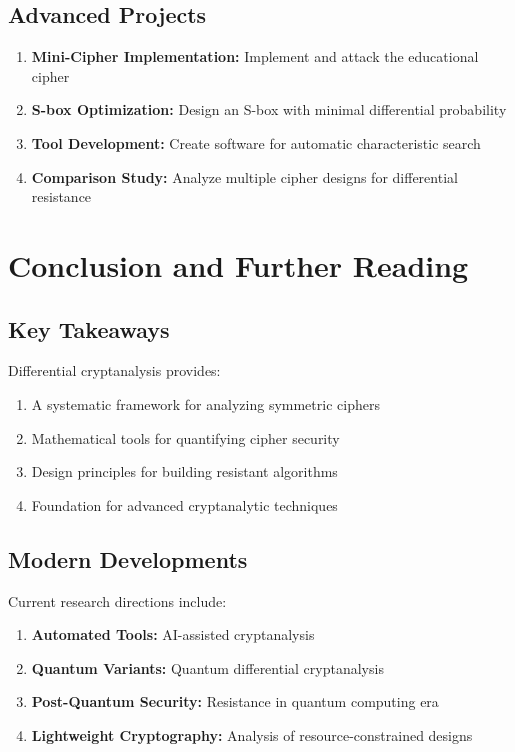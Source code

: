 \documentclass[12pt,a4paper]{article}
\theoremstyle{definition}
\begin{document}
\subsection{Advanced Projects}

\begin{enumerate}
    \item \textbf{Mini-Cipher Implementation:} Implement and attack the educational cipher
    \item \textbf{S-box Optimization:} Design an S-box with minimal differential probability
    \item \textbf{Tool Development:} Create software for automatic characteristic search
    \item \textbf{Comparison Study:} Analyze multiple cipher designs for differential resistance
\end{enumerate}

\section{Conclusion and Further Reading}

\subsection{Key Takeaways}

Differential cryptanalysis provides:

\begin{enumerate}
    \item A systematic framework for analyzing symmetric ciphers
    \item Mathematical tools for quantifying cipher security
    \item Design principles for building resistant algorithms
    \item Foundation for advanced cryptanalytic techniques
\end{enumerate}

\subsection{Modern Developments}

Current research directions include:

\begin{enumerate}
    \item \textbf{Automated Tools:} AI-assisted cryptanalysis
    \item \textbf{Quantum Variants:} Quantum differential cryptanalysis
    \item \textbf{Post-Quantum Security:} Resistance in quantum computing era
    \item \textbf{Lightweight Cryptography:} Analysis of resource-constrained designs
\end{enumerate}
\end{document}
